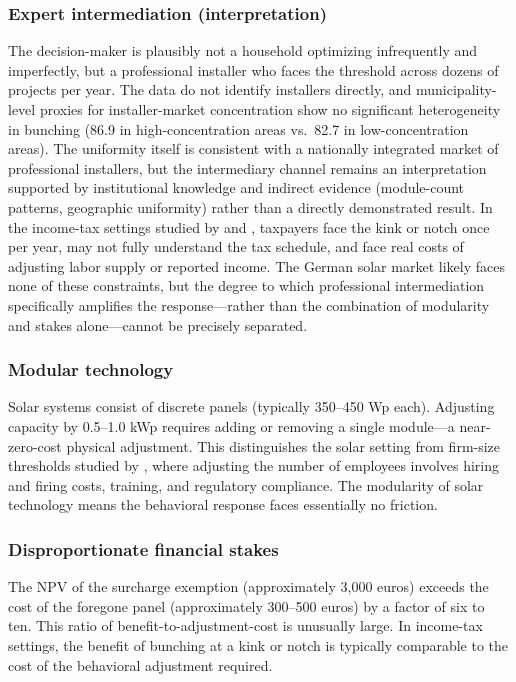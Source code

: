 \documentclass[12pt]{article}
\begin{document}
\subsubsection*{Expert intermediation (interpretation)} The decision-maker is plausibly not a household optimizing infrequently and imperfectly, but a professional installer who faces the threshold across dozens of projects per year. The data do not identify installers directly, and municipality-level proxies for installer-market concentration show no significant heterogeneity in bunching (86.9 in high-concentration areas vs.\ 82.7 in low-concentration areas). The uniformity itself is consistent with a nationally integrated market of professional installers, but the intermediary channel remains an interpretation supported by institutional knowledge and indirect evidence (module-count patterns, geographic uniformity) rather than a directly demonstrated result. In the income-tax settings studied by \citet{saez2010taxpayers} and \citet{kleven2013using}, taxpayers face the kink or notch once per year, may not fully understand the tax schedule, and face real costs of adjusting labor supply or reported income. The German solar market likely faces none of these constraints, but the degree to which professional intermediation specifically amplifies the response---rather than the combination of modularity and stakes alone---cannot be precisely separated.

\subsubsection*{Modular technology} Solar systems consist of discrete panels (typically 350--450 Wp each). Adjusting capacity by 0.5--1.0 kWp requires adding or removing a single module---a near-zero-cost physical adjustment. This distinguishes the solar setting from firm-size thresholds studied by \citet{garicano2016firm}, where adjusting the number of employees involves hiring and firing costs, training, and regulatory compliance. The modularity of solar technology means the behavioral response faces essentially no friction.

\subsubsection*{Disproportionate financial stakes} The NPV of the surcharge exemption (approximately 3,000 euros) exceeds the cost of the foregone panel (approximately 300--500 euros) by a factor of six to ten. This ratio of benefit-to-adjustment-cost is unusually large. In income-tax settings, the benefit of bunching at a kink or notch is typically comparable to the cost of the behavioral adjustment required.
\end{document}
